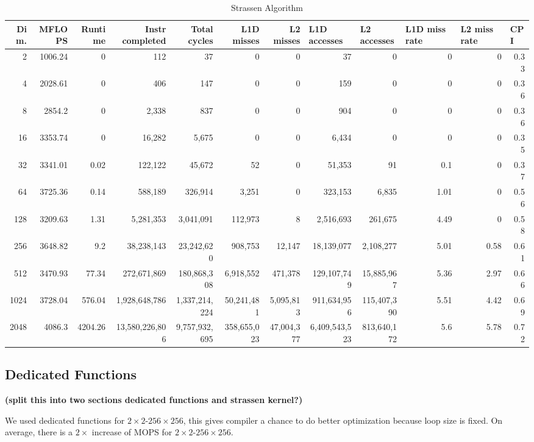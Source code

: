 \documentclass{article}
\begin{document}
\begin{table}[htbp]
\tiny
\caption{Strassen Algorithm}
\begin{tabular}{|r|r|r|r|r|r|r|r|r|r|r|r|}
\hline
Dim. &   MFLOPS &     Runtime & Instr completed & Total cycles & L1D misses & L2 misses & \multicolumn{1}{l|}{L1D accesses} & \multicolumn{1}{l|}{ L2 accesses} & \multicolumn{1}{l|}{L1D miss rate} & \multicolumn{1}{l|}{L2 miss rate} & \multicolumn{1}{l|}{CPI} \\ \hline
2 & 1006.24 & 0 & 112 & 37 & 0 & 0 & 37 & 0 & 0 & 0 & 0.33 \\ \hline
4 & 2028.61 & 0 & 406 & 147 & 0 & 0 & 159 & 0 & 0 & 0 & 0.36 \\ \hline
8 & 2854.2 & 0 & 2,338 & 837 & 0 & 0 & 904 & 0 & 0 & 0 & 0.36 \\ \hline
16 & 3353.74 & 0 & 16,282 & 5,675 & 0 & 0 & 6,434 & 0 & 0 & 0 & 0.35 \\ \hline
32 & 3341.01 & 0.02 & 122,122 & 45,672 & 52 & 0 & 51,353 & 91 & 0.1 & 0 & 0.37 \\ \hline
64 & 3725.36 & 0.14 & 588,189 & 326,914 & 3,251 & 0 & 323,153 & 6,835 & 1.01 & 0 & 0.56 \\ \hline
128 & 3209.63 & 1.31 & 5,281,353 & 3,041,091 & 112,973 & 8 & 2,516,693 & 261,675 & 4.49 & 0 & 0.58 \\ \hline
256 & 3648.82 & 9.2 & 38,238,143 & 23,242,620 & 908,753 & 12,147 & 18,139,077 & 2,108,277 & 5.01 & 0.58 & 0.61 \\ \hline
512 & 3470.93 & 77.34 & 272,671,869 & 180,868,308 & 6,918,552 & 471,378 & 129,107,749 & 15,885,967 & 5.36 & 2.97 & 0.66 \\ \hline
1024 & 3728.04 & 576.04 & 1,928,648,786 & 1,337,214,224 & 50,241,481 & 5,095,813 & 911,634,956 & 115,407,390 & 5.51 & 4.42 & 0.69 \\ \hline
2048 & 4086.3 & 4204.26 & 13,580,226,806 & 9,757,932,695 & 358,655,023 & 47,004,377 & 6,409,543,523 & 813,640,172 & 5.6 & 5.78 & 0.72 \\ \hline
\end{tabular}
\label{}
\end{table}

\subsection{Dedicated Functions}
{\bf (split this into two sections dedicated functions and strassen kernel?) }

We used dedicated functions for $2\times2$-$256\times256$, this gives compiler a chance to do better optimization because loop size is fixed.  On average, there is a $2\times$ increase of MOPS for $2\times2$-$256\times256$.
\end{document}
